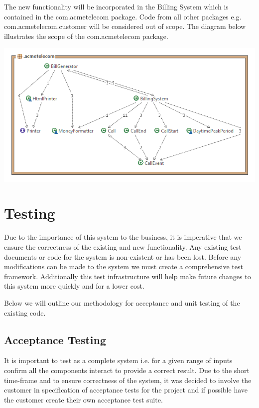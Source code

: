 \documentclass[pdftex,11pt,a4paper]{article}
\begin{document}
The new functionality will be incorporated in the Billing System which is contained in the com.acmetelecom package. Code from all other packages e.g. com.acmetelecom.customer will be considered out of scope. The diagram below illustrates the scope of the com.acmetelecom package. 

\begin{center}
	\includegraphics[scale=0.55]{images/Acme_Telecom_Structure.png}
\end{center}

\section{Testing}
Due to the importance of this system to the business, it is imperative that we ensure the correctness of the existing and new functionality. Any existing test documents or code for the system is non-existent or has been lost. Before any modifications can be made to the system we must create a comprehensive test framework. Additionally this test infrastructure will help make future changes to this system more quickly and for a lower cost.

Below we will outline our methodology for acceptance and unit testing of the existing code.

\subsection{Acceptance Testing}
It is important to test as a complete system i.e. for a given range of inputs confirm all the components interact to provide a correct result. Due to the short time-frame and to ensure correctness of the system, it was decided to involve the customer in specification of acceptance tests for the project and if possible have the customer create their own acceptance test suite. 
\end{document}
